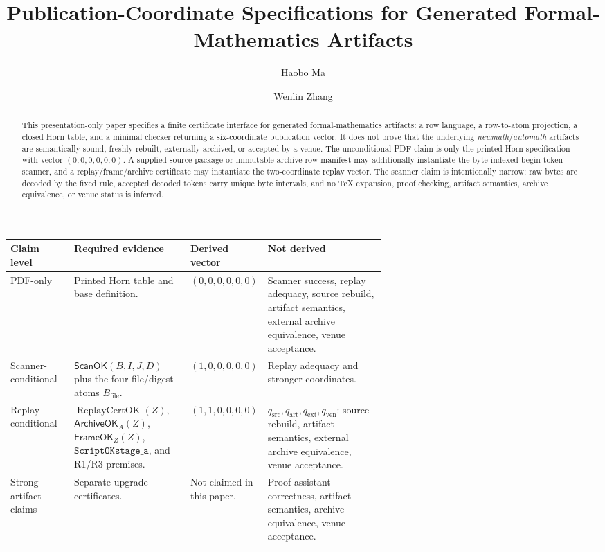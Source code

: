 \documentclass[runningheads]{llncs}
\title{Publication-Coordinate Specifications for Generated Formal-Mathematics Artifacts}
\author{Haobo Ma\inst{1} \and Wenlin Zhang\inst{2}}
\institute{AELF PTE LTD. \email{auric@aelf.io} \and
National University of Singapore \email{e1327962@u.nus.edu}}
\newcommand{\ScanOK}{\mathsf{ScanOK}}
\newcommand{\ArchiveOKA}{\mathsf{ArchiveOK}_{A}}
\newcommand{\FrameOKZ}{\mathsf{FrameOK}_{Z}}
\newcommand{\qsrc}{q_{\mathrm{src}}}
\newcommand{\qart}{q_{\mathrm{art}}}
\newcommand{\qext}{q_{\mathrm{ext}}}
\newcommand{\qven}{q_{\mathrm{ven}}}
\begin{document}
\maketitle

\begin{abstract}
This presentation-only paper specifies a finite certificate interface for
generated formal-mathematics artifacts: a row language, a row-to-atom
projection, a closed Horn table, and a minimal checker returning a six-coordinate
publication vector.  It does not prove that the underlying
\emph{newmath}/\emph{automath} artifacts are semantically sound, freshly rebuilt,
externally archived, or accepted by a venue.  The unconditional PDF claim is only
the printed Horn specification with vector \((0,0,0,0,0,0)\).  A supplied
source-package or immutable-archive row manifest may additionally instantiate
the byte-indexed begin-token scanner, and a replay/frame/archive certificate may
instantiate the two-coordinate replay vector.  The scanner claim is intentionally
narrow: raw bytes are decoded by the fixed rule, accepted decoded tokens carry
unique byte intervals, and no \TeX{} expansion, proof checking, artifact
semantics, archive equivalence, or venue status is inferred.
\end{abstract}

\label{claim-matrix:first-page}
\vspace{-0.5\baselineskip}
\begin{center}
\scriptsize
\setlength{\tabcolsep}{1.5pt}
\renewcommand{\arraystretch}{0.9}
\begin{tabularx}{\linewidth}{@{}L{0.17\linewidth}L{0.31\linewidth}L{0.15\linewidth}Y@{}}
\toprule
\textbf{Claim level} & \textbf{Required evidence} & \textbf{Derived vector} &
\textbf{Not derived} \\ \midrule
PDF-only &
Printed Horn table and base definition. &
\((0,0,0,0,0,0)\) &
Scanner success, replay adequacy, source rebuild, artifact semantics, external
archive equivalence, venue acceptance.\\
\addlinespace
Scanner-conditional &
\(\ScanOK(B,I,J,D)\) plus the four file/digest atoms \(B_{\mathrm{file}}\). &
\((1,0,0,0,0,0)\) &
Replay adequacy and stronger coordinates.\\
\addlinespace
Replay-conditional &
\(\operatorname{ReplayCertOK}(Z)\), \(\ArchiveOKA(Z)\), \(\FrameOKZ(Z)\),
\(\texttt{ScriptOKstage\_a}\), and R1/R3 premises. &
\((1,1,0,0,0,0)\) &
\(\qsrc,\qart,\qext,\qven\): source rebuild, artifact semantics, external
archive equivalence, venue acceptance.\\
\addlinespace
Strong artifact claims &
Separate upgrade certificates. &
Not claimed in this paper. &
Proof-assistant correctness, artifact semantics, archive equivalence, venue
acceptance.\\
\bottomrule
\end{tabularx}
\end{center}
\vspace{-0.25\baselineskip}
\end{document}
